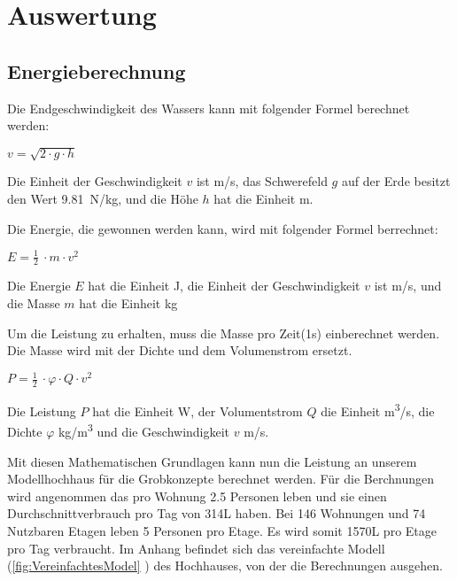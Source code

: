 \section{Auswertung} \label{sec:auswertung}



\subsection{Energieberechnung} \label{subsec:energieberechnung}

Die Endgeschwindigkeit des Wassers kann mit folgender Formel berechnet werden:
\begin{center}
\(v = \sqrt{2 \cdot g \cdot h} \)
\end{center}

Die Einheit der Geschwindigkeit \(v\) ist \si{m/s}, das Schwerefeld \(g\) auf der Erde besitzt den Wert 9.81~\si{N/kg}, und die Höhe \(h\) hat die Einheit \si{m}.

\bigskip

Die Energie, die gewonnen werden kann, wird mit folgender Formel berrechnet:

\begin{center}
\(E =\frac 12\ \cdot m \cdot v^2\)
\end{center}

Die Energie \(E\) hat die Einheit \si{J}, die Einheit der Geschwindigkeit \(v\) ist \si{m/s}, und die Masse \(m\) hat die Einheit \si{kg}

\bigskip

Um die Leistung zu erhalten, muss die Masse pro Zeit(1s) einberechnet werden. Die Masse wird mit der Dichte und dem Volumenstrom ersetzt.

\begin{center}
\(P =\frac 12\ \cdot \varphi \cdot Q \cdot v^2\)
\end{center}

Die Leistung \(P\) hat die Einheit \si{W}, der Volumentstrom \(Q\) die Einheit \si{m^3/s}, die Dichte \(\varphi\) \si{kg/m^3} und die Geschwindigkeit \(v\) \si{m/s}.

\newpage

Mit diesen Mathematischen Grundlagen kann nun die Leistung an unserem Modellhochhaus für die Grobkonzepte berechnet werden. Für die Berchnungen wird angenommen das pro Wohnung 2.5 Personen leben und sie einen Durchschnittverbrauch pro Tag von 314\si{L} haben. Bei 146 Wohnungen und 74 Nutzbaren Etagen leben 5 Personen pro Etage. Es wird somit 1570\si{L} pro Etage pro Tag verbraucht. Im Anhang befindet sich das vereinfachte Modell (\ref{fig:VereinfachtesModel} ) des Hochhauses, von der die Berechnungen ausgehen.

